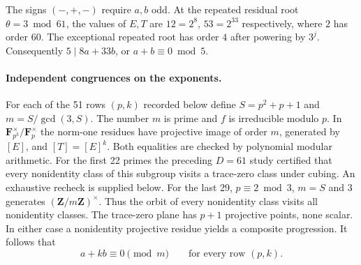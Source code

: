 \documentclass[11pt,a4paper,oneside,openany]{book}
\begin{document}
The signs $(-,+,-)$ require $a,b$ odd. At the repeated residual root
$\theta=3\bmod61$, the values of $E,T$ are $12=2^8$, $53=2^{33}$
respectively, where $2$ has order $60$. The exceptional repeated root has
order $4$ after powering by $3^j$. Consequently $5\mid 8a+33b$, or
$a+b\equiv0\bmod5$.


\paragraph{Independent congruences on the exponents.}
For each of the 51 rows $(p,k)$ recorded below define
$S=p^2+p+1$ and $m=S/\gcd(3,S)$. The number $m$ is prime and $f$ is
irreducible modulo $p$. In $\mathbf F_{p^3}^\times/\mathbf F_p^\times$
the norm-one residues have projective image of order $m$,
generated by $[E]$, and $[T]=[E]^k$. Both equalities are checked by
polynomial modular arithmetic. For the first 22 primes the preceding
$D=61$ study certified that every nonidentity class of this subgroup visits
a trace-zero class under cubing. An exhaustive recheck is supplied below.
For the last 29, $p\equiv2\bmod3$, $m=S$ and $3$ generates
$(\mathbf Z/m\mathbf Z)^\times$. Thus the orbit of every nonidentity
class visits all nonidentity classes. The trace-zero plane has $p+1$
projective points, none scalar. In either case a nonidentity projective
residue yields a composite progression. It follows that
\[
                 a+k b\equiv0\pmod m
                 \qquad\text{for every row }(p,k).
\]
\end{document}
